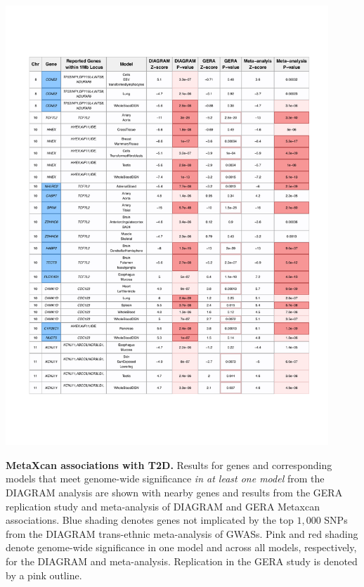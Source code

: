 \documentclass[10pt]{article}
\begin{document}
\begin{table}
\ContinuedFloat
\includegraphics[width=0.91\textwidth]{table1_part2.pdf}
\caption{\textbf{MetaXcan associations with T2D.} Results for genes and corresponding models that meet genome-wide significance \textit{in at least one model} from the DIAGRAM analysis are shown with nearby genes and results from the GERA replication study and meta-analysis of DIAGRAM and GERA Metaxcan associations. Blue shading denotes genes not implicated by the top $1,000$ SNPs from the DIAGRAM trans-ethnic meta-analysis of GWASs. Pink and red shading denote genome-wide significance in one model and across all models, respectively, for the DIAGRAM and meta-analysis. Replication in the GERA study is denoted by a pink outline.} \label{tab:table1.part2}
\end{table}
\end{document}
